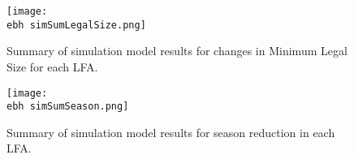\documentclass[11pt]{article}
\newcommand{\ebh}{/backup/bio_data/bio.lobster/figures/LFA2733Framework2018/} %
\begin{document}
    \begin{figure}
    \centering
        \texttt{[image: \\ebh simSumLegalSize.png]}
        \caption{Summary of simulation model results for changes in Minimum Legal Size for each LFA.}

    \end{figure}

    \begin{figure}
    \centering
        \texttt{[image: \\ebh simSumSeason.png]}
        \caption{Summary of simulation model results for season reduction in each LFA.}   

    \end{figure}    
  
\end{document}
